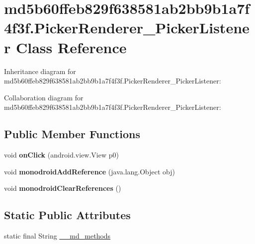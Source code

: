 \hypertarget{classmd5b60ffeb829f638581ab2bb9b1a7f4f3f_1_1_picker_renderer___picker_listener}{}\section{md5b60ffeb829f638581ab2bb9b1a7f4f3f.\+Picker\+Renderer\+\_\+\+Picker\+Listener Class Reference}
\label{classmd5b60ffeb829f638581ab2bb9b1a7f4f3f_1_1_picker_renderer___picker_listener}


Inheritance diagram for md5b60ffeb829f638581ab2bb9b1a7f4f3f.\+Picker\+Renderer\+\_\+\+Picker\+Listener\+:


Collaboration diagram for md5b60ffeb829f638581ab2bb9b1a7f4f3f.\+Picker\+Renderer\+\_\+\+Picker\+Listener\+:
\subsection*{Public Member Functions}
\begin{DoxyCompactItemize}
\item 
\mbox{\label{classmd5b60ffeb829f638581ab2bb9b1a7f4f3f_1_1_picker_renderer___picker_listener_aef0d59497745728afe6baf752662eb80}} 
void {\bfseries on\+Click} (android.\+view.\+View p0)
\item 
\mbox{\label{classmd5b60ffeb829f638581ab2bb9b1a7f4f3f_1_1_picker_renderer___picker_listener_a1ecadd473c72ac34242c9c05a4fbee20}} 
void {\bfseries monodroid\+Add\+Reference} (java.\+lang.\+Object obj)
\item 
\mbox{\label{classmd5b60ffeb829f638581ab2bb9b1a7f4f3f_1_1_picker_renderer___picker_listener_ac661d5ab4c8deffbe678f76e609c7e1f}} 
void {\bfseries monodroid\+Clear\+References} ()
\end{DoxyCompactItemize}
\subsection*{Static Public Attributes}
\begin{DoxyCompactItemize}
\item 
static final String \hyperlink{classmd5b60ffeb829f638581ab2bb9b1a7f4f3f_1_1_picker_renderer___picker_listener_a69ae8fbc93864ac38ac6d4c96542e2b5}{\+\_\+\+\_\+md\+\_\+methods}
\end{DoxyCompactItemize}


